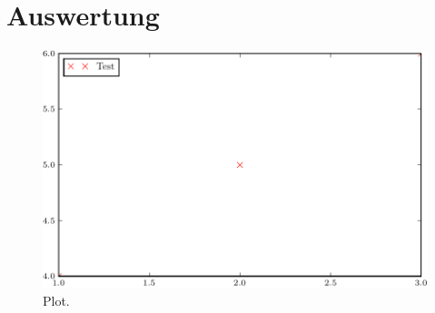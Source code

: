 \section{Auswertung}
\label{sec:Auswertung}

\begin{figure}
  \centering
  \includegraphics[]{pc/plot.pdf}
  \caption{Plot.}
  \label{fig:plot}
\end{figure}
